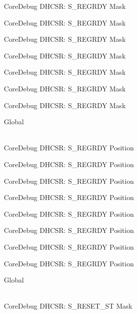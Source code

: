 \begin{DoxyRefList}
\label{deprecated__deprecated000120}%
%
Core\+Debug DHCSR\+: S\+\_\+\+REGRDY Mask 

\label{deprecated__deprecated000174}%
%
Core\+Debug DHCSR\+: S\+\_\+\+REGRDY Mask 

\label{deprecated__deprecated000259}%
%
Core\+Debug DHCSR\+: S\+\_\+\+REGRDY Mask 

\label{deprecated__deprecated000316}%
%
Core\+Debug DHCSR\+: S\+\_\+\+REGRDY Mask 

\label{deprecated__deprecated000392}%
%
Core\+Debug DHCSR\+: S\+\_\+\+REGRDY Mask 

\label{deprecated__deprecated000479}%
%
Core\+Debug DHCSR\+: S\+\_\+\+REGRDY Mask 

\label{deprecated__deprecated000581}%
%
Core\+Debug DHCSR\+: S\+\_\+\+REGRDY Mask  
\item[{\parbox[t]{\linewidth}{Global \doxylink{group___c_m_s_i_s___core_debug_ga20a71871ca8768019c51168c70c3f41d}{Core\+Debug\+\_\+\+DHCSR\+\_\+\+S\+\_\+\+REGRDY\+\_\+\+Pos} }}]\hfill \\
\label{deprecated__deprecated000027}%
%
Core\+Debug DHCSR\+: S\+\_\+\+REGRDY Position 

\label{deprecated__deprecated000119}%
%
Core\+Debug DHCSR\+: S\+\_\+\+REGRDY Position 

\label{deprecated__deprecated000173}%
%
Core\+Debug DHCSR\+: S\+\_\+\+REGRDY Position 

\label{deprecated__deprecated000258}%
%
Core\+Debug DHCSR\+: S\+\_\+\+REGRDY Position 

\label{deprecated__deprecated000315}%
%
Core\+Debug DHCSR\+: S\+\_\+\+REGRDY Position 

\label{deprecated__deprecated000391}%
%
Core\+Debug DHCSR\+: S\+\_\+\+REGRDY Position 

\label{deprecated__deprecated000478}%
%
Core\+Debug DHCSR\+: S\+\_\+\+REGRDY Position 

\label{deprecated__deprecated000580}%
%
Core\+Debug DHCSR\+: S\+\_\+\+REGRDY Position  
\item[{\parbox[t]{\linewidth}{Global \doxylink{group___c_m_s_i_s___core_debug_gac474394bcceb31a8e09566c90b3f8922}{Core\+Debug\+\_\+\+DHCSR\+\_\+\+S\+\_\+\+RESET\+\_\+\+ST\+\_\+\+Msk} }}]\hfill \\
\label{deprecated__deprecated000010}%
%
Core\+Debug DHCSR\+: S\+\_\+\+RESET\+\_\+\+ST Mask 


\end{DoxyRefList}
